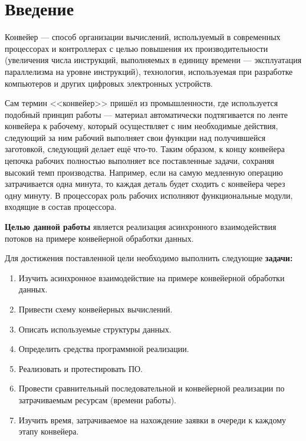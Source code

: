 \documentclass[a4paper,oneside,14pt]{extreport}
\begin{document}

\newpage
\tableofcontents
{}

\newpage

\chapter*{Введение}
Конвейер — способ организации вычислений, используемый в современных процессорах и контроллерах с целью повышения их производительности (увеличения числа инструкций, выполняемых в единицу времени — эксплуатация параллелизма на уровне инструкций), технология, используемая при разработке компьютеров и других цифровых электронных устройств.

Сам термин <<конвейер>> пришёл из промышленности, где используется подобный принцип работы — материал автоматически подтягивается по ленте конвейера к рабочему, который осуществляет с ним необходимые действия, следующий за ним рабочий выполняет свои функции над получившейся заготовкой, следующий делает ещё что-то. Таким образом, к концу конвейера цепочка рабочих полностью выполняет все поставленные задачи, сохраняя высокий темп производства. Например, если на самую медленную операцию затрачивается одна минута, то каждая деталь будет сходить с конвейера через одну минуту. В процессорах роль рабочих исполняют функциональные модули, входящие в состав процессора.


\textbf{Целью данной работы} является реализация асинхронного взаимодействия потоков на примере конвейерной обработки данных.

Для достижения поставленной цели необходимо выполнить следующие \textbf{задачи:}
\begin{enumerate}
	\item Изучить асинхронное взаимодействие на примере конвейерной обработки данных.
	\item Привести схему конвейерных вычислений.
	\item Описать используемые структуры данных.
	\item Определить средства программной реализации.
	\item Реализовать и протестировать ПО.
	\item Провести сравнительный последовательной и конвейерной реализации по затрачиваемым ресурсам (времени работы).
	\item Изучить время, затрачиваемое на нахождение заявки в очереди к каждому этапу конвейера.
\end{enumerate}
\newpage
\end{document}
